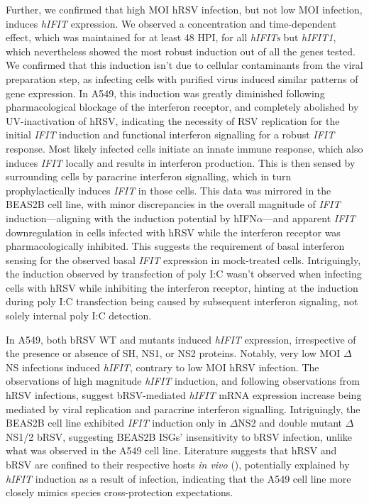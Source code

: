 Further, we confirmed that high MOI hRSV infection, but not low MOI infection, induces \textit{hIFIT} expression. We observed a concentration and time-dependent effect, which was maintained for at least 48 HPI, for all \textit{hIFITs} but \textit{hIFIT1}, which nevertheless showed the most robust induction out of all the genes tested. We confirmed that this induction isn't due to cellular contaminants from the viral preparation step, as infecting cells with purified virus induced similar patterns of gene expression.  In A549, this induction was greatly diminished following pharmacological blockage of the interferon receptor, and completely abolished by UV-inactivation of hRSV, indicating the necessity of RSV replication for the initial \textit{IFIT} induction and functional interferon signalling for a robust \textit{IFIT} response. Most likely infected cells initiate an innate immune response, which also induces \textit{IFIT} locally and results in interferon production. This is then sensed by surrounding cells by paracrine interferon signalling, which in turn prophylactically induces \textit{IFIT} in those cells. This data was mirrored in the BEAS2B cell line, with minor discrepancies in the overall magnitude of \textit{IFIT} induction—aligning with the induction potential by hIFN$\alpha$—and apparent \textit{IFIT} downregulation in cells infected with hRSV while the interferon receptor was pharmacologically inhibited. This suggests the requirement of basal interferon sensing for the observed basal \textit{IFIT} expression in mock-treated cells. Intriguingly, the induction observed by transfection of poly I:C wasn't observed when infecting cells with hRSV while inhibiting the interferon receptor, hinting at the induction during poly I:C transfection being caused by subsequent interferon signaling, not solely internal poly I:C detection.

In A549, both bRSV WT and mutants induced \textit{hIFIT} expression, irrespective of the presence or absence of SH, NS1, or NS2 proteins. Notably, very low MOI $\Delta$NS infections induced \textit{hIFIT}, contrary to low MOI hRSV infection. The observations of high magnitude \textit{hIFIT} induction, and following observations from hRSV infections, suggest bRSV-mediated \textit{hIFIT} mRNA expression increase being mediated by viral replication and paracrine interferon signalling. Intriguingly, the BEAS2B cell line exhibited \textit{IFIT} induction only in $\Delta$NS2 and double mutant $\Delta$NS1/2 bRSV, suggesting BEAS2B ISGs' insensitivity to bRSV infection, unlike what was observed in the A549 cell line. Literature suggests that hRSV and bRSV are confined to their respective hosts \textit{in vivo} (\cite{Buchholz2000ChimericVaccine}), potentially explained by \textit{hIFIT} induction as a result of infection, indicating that the A549 cell line more closely mimics species cross-protection expectations.


